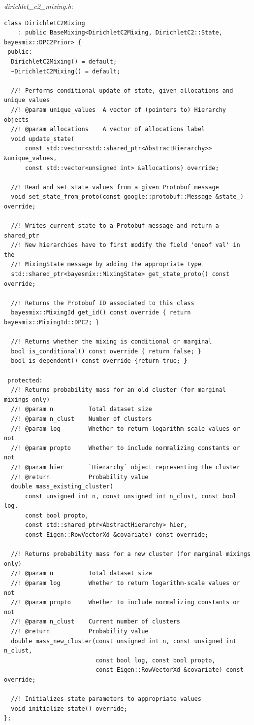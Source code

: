 \documentclass[12pt,a4paper]{article}
\begin{document}
\textit{dirichlet\_c2\_mixing.h}:
\begin{lstlisting} 
class DirichletC2Mixing
    : public BaseMixing<DirichletC2Mixing, DirichletC2::State, bayesmix::DPC2Prior> {
 public:
  DirichletC2Mixing() = default;
  ~DirichletC2Mixing() = default;

  //! Performs conditional update of state, given allocations and unique values
  //! @param unique_values  A vector of (pointers to) Hierarchy objects
  //! @param allocations    A vector of allocations label
  void update_state(
      const std::vector<std::shared_ptr<AbstractHierarchy>> &unique_values,
      const std::vector<unsigned int> &allocations) override;

  //! Read and set state values from a given Protobuf message
  void set_state_from_proto(const google::protobuf::Message &state_) override;

  //! Writes current state to a Protobuf message and return a shared_ptr
  //! New hierarchies have to first modify the field 'oneof val' in the
  //! MixingState message by adding the appropriate type
  std::shared_ptr<bayesmix::MixingState> get_state_proto() const override;

  //! Returns the Protobuf ID associated to this class
  bayesmix::MixingId get_id() const override { return bayesmix::MixingId::DPC2; }

  //! Returns whether the mixing is conditional or marginal
  bool is_conditional() const override { return false; }
  bool is_dependent() const override {return true; }

 protected:
  //! Returns probability mass for an old cluster (for marginal mixings only)
  //! @param n          Total dataset size
  //! @param n_clust    Number of clusters
  //! @param log        Whether to return logarithm-scale values or not
  //! @param propto     Whether to include normalizing constants or not
  //! @param hier       `Hierarchy` object representing the cluster
  //! @return           Probability value
  double mass_existing_cluster(
      const unsigned int n, const unsigned int n_clust, const bool log,
      const bool propto,
      const std::shared_ptr<AbstractHierarchy> hier,
      const Eigen::RowVectorXd &covariate) const override;

  //! Returns probability mass for a new cluster (for marginal mixings only)
  //! @param n          Total dataset size
  //! @param log        Whether to return logarithm-scale values or not
  //! @param propto     Whether to include normalizing constants or not
  //! @param n_clust    Current number of clusters
  //! @return           Probability value
  double mass_new_cluster(const unsigned int n, const unsigned int n_clust,
                          const bool log, const bool propto,
                          const Eigen::RowVectorXd &covariate) const override;

  //! Initializes state parameters to appropriate values
  void initialize_state() override;
};
\end{lstlisting}
\end{document}
